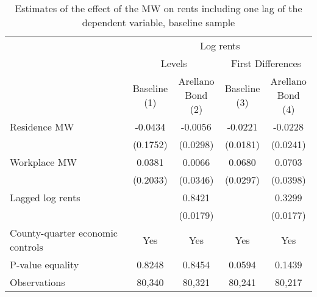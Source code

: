 \begin{table}[hbt!]
    \centering
    \caption{Estimates of the effect of the MW on rents including one lag of the 
             dependent variable, baseline sample}
    \label{tab:arellano_bond}

    \begin{tabular}{@{}lcccc@{}}
        \toprule
                                             & \multicolumn{4}{c}{Log rents}                                                       \\ \cmidrule(lr){2-5} 
                                             & \multicolumn{2}{c}{Levels}               & \multicolumn{2}{c}{First Differences}    \\ \cmidrule(lr){2-3}\cmidrule(lr){4-5} 
        \multicolumn{1}{c}{}                 & \shortstack{Baseline\\(1)} 
                                             & \shortstack{Arellano\\Bond (2)} 
                                             & \shortstack{Baseline\\(3)} 
                                             & \shortstack{Arellano\\Bond (4)}                                                     \\ \midrule
        Residence MW                         & -0.0434                  & -0.0056               & -0.0221                  & -0.0228               \\
                                             & (0.1752)                & (0.0298)             & (0.0181)                & (0.0241)             \\
        Workplace MW                         & 0.0381                  & 0.0066               & 0.0680                  & 0.0703               \\
                                             & (0.2033)                & (0.0346)             & (0.0297)                & (0.0398)             \\
        Lagged log rents                     &                      & 0.8421               &                      & 0.3299               \\
                                             &                      & (0.0179)             &                      & (0.0177)             \\ \midrule
        County-quarter economic controls     & Yes                  & Yes               & Yes                  & Yes               \\
        P-value equality                     & 0.8248                  & 0.8454               & 0.0594                  & 0.1439               \\
        Observations                         & 80,340                 & 80,321              & 80,241                 & 80,217              \\ \bottomrule


\end{tabular}
\end{table}
